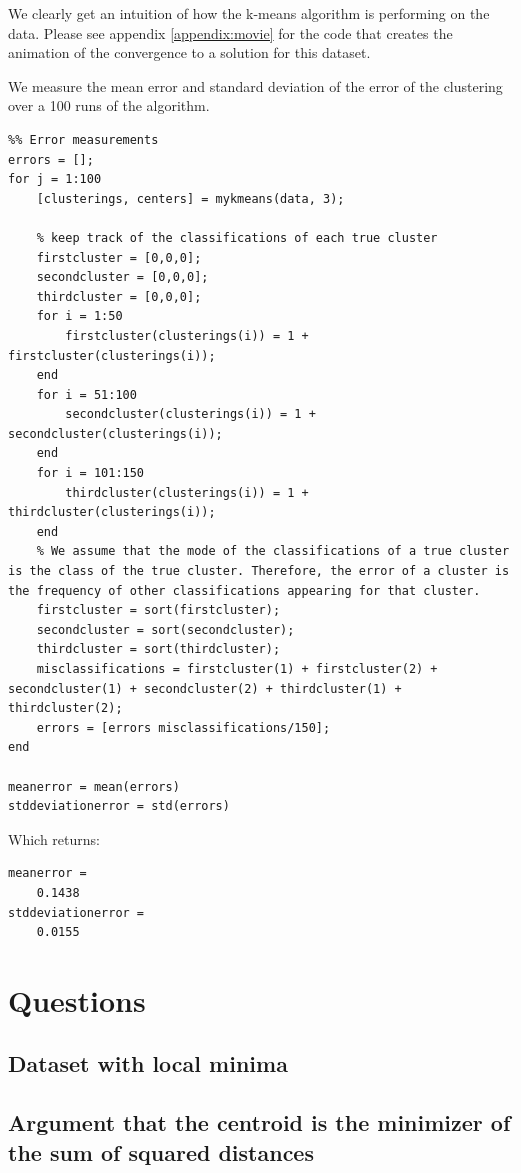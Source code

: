 \documentclass[11pt]{article}
\begin{document}
    We clearly get an intuition of how the k-means algorithm is performing on the data. Please see appendix \ref{appendix:movie} for the code that creates the animation of the convergence to a solution for this dataset.
    \par We measure the mean error and standard deviation of the error of the clustering over a 100 runs of the algorithm.
    \begin{lstlisting}
%% Error measurements
errors = [];
for j = 1:100
    [clusterings, centers] = mykmeans(data, 3);
    
    % keep track of the classifications of each true cluster
    firstcluster = [0,0,0];
    secondcluster = [0,0,0];
    thirdcluster = [0,0,0];
    for i = 1:50
        firstcluster(clusterings(i)) = 1 + firstcluster(clusterings(i));
    end
    for i = 51:100
        secondcluster(clusterings(i)) = 1 + secondcluster(clusterings(i));
    end
    for i = 101:150
        thirdcluster(clusterings(i)) = 1 + thirdcluster(clusterings(i));
    end
    % We assume that the mode of the classifications of a true cluster is the class of the true cluster. Therefore, the error of a cluster is the frequency of other classifications appearing for that cluster.
    firstcluster = sort(firstcluster);
    secondcluster = sort(secondcluster);
    thirdcluster = sort(thirdcluster);
    misclassifications = firstcluster(1) + firstcluster(2) + secondcluster(1) + secondcluster(2) + thirdcluster(1) + thirdcluster(2);
    errors = [errors misclassifications/150];
end

meanerror = mean(errors)
stddeviationerror = std(errors)\end{lstlisting}
    
    Which returns:
    \begin{lstlisting}
meanerror =
    0.1438
stddeviationerror =
    0.0155\end{lstlisting}

\section{Questions}
\subsection{Dataset with local minima}

\subsection{Argument that the centroid is the minimizer of the sum of squared distances}
\end{document}
